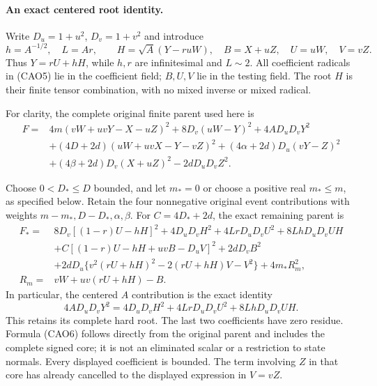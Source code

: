 \paragraph{An exact centered root identity.}
Write $D_u=1+u^2$, $D_v=1+v^2$ and introduce
\[
 h=A^{-1/2},\quad L=Ar,\qquad
 H=\sqrt A(Y-ruW),\quad B=X+uZ,\quad U=uW,\quad V=vZ.
 \tag{CAO5}
\]
Thus $Y=rU+hH$, while $h,r$ are infinitesimal and $L\sim2$.
All coefficient radicals in (CAO5) lie in the coefficient field;
$B,U,V$ lie in the testing field. The root $H$ is their finite tensor
combination, with no mixed inverse or mixed radical.

For clarity, the complete original finite parent used here is
\begin{align*}
F={}&4m(vW+uvY-X-uZ)^2+8D_v(uW-Y)^2
       +4AD_uD_vY^2\\
 &+(4D+2d)(uW+uvX-Y-vZ)^2
   +(4\alpha+2d)D_u(vY-Z)^2\\
 &+(4\beta+2d)D_v(X+uZ)^2-2dD_uD_vZ^2.
\end{align*}

Choose $0<D_*\le D$ bounded, and let $m_*=0$ or choose a positive
real $m_*\le m$, as specified below. Retain the four nonnegative
original event contributions with weights $m-m_*,D-D_*,\alpha,\beta$.
For $C=4D_*+2d$, the exact remaining parent is
\begin{align*}
F_*={}&8D_v[(1-r)U-hH]^2
 +4D_uD_vH^2+4LrD_uD_vU^2+8LhD_uD_vUH\\
&+C[(1-r)U-hH+uvB-D_uV]^2+2dD_vB^2\\
&+2dD_u\{v^2(rU+hH)^2-2(rU+hH)V-V^2\}
 +4m_*R_m^2,                                      \tag{CAO6}\\
R_m={}&vW+uv(rU+hH)-B.
\end{align*}
In particular, the centered $A$ contribution is the exact identity
\[
 4AD_uD_vY^2
 =4D_uD_vH^2+4LrD_uD_vU^2+8LhD_uD_vUH.
\]
This retains its complete hard root. The last two coefficients have
zero residue. Formula (CAO6) follows directly from the original parent
and includes the complete signed core; it is not an eliminated scalar
or a restriction to state normals. Every displayed coefficient is
bounded. The term involving $Z$ in that core has already cancelled
to the displayed expression in $V=vZ$.

